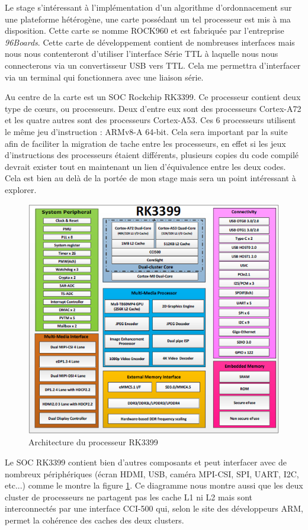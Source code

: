 Le stage s'intéressant à l'implémentation d'un algorithme d'ordonnacement sur une plateforme hétérogène, une carte possédant un tel processeur est mis à ma disposition. Cette carte se nomme ROCK960 et est fabriquée par l'entreprise \textit{96Boards}. Cette carte de développement contient de nombreuses interfaces mais nous nous contenteront d'utiliser l'interface Série TTL à laquelle nous nous connecterons via un convertisseur USB vers TTL. Cela me permettra d'interfacer via un terminal qui fonctionnera avec une liaison série. 

Au centre de la carte est un \gls{SOC} Rockchip RK3399. Ce processeur contient deux type de cœurs, ou processeurs. Deux d'entre eux sont des processeurs Cortex-A72 et les quatre autres sont des processeurs Cortex-A53. Ces 6 processeurs utilisent le même jeu d'instruction : ARMv8-A 64-bit. Cela sera important par la suite afin de faciliter la migration de tache entre les processeurs, en effet si les jeux d'instructions des processeurs étaient différents, plusieurs copies du code compilé devrait exister tout en maintenant un lien d'équivalence entre les deux codes. Cela est bien au delà de la portée de mon stage mais sera un point intéressant à explorer.

\begin{figure}[H]
    \centering
    \includegraphics[width=0.45\paperwidth]{Images/RK3399_Block_Diagram.png}
    \caption{Architecture du processeur RK3399}
    \label{fig:archi_rk3399}
\end{figure}

Le SOC RK3399 contient bien d'autres composants et peut interfacer avec de nombreux périphériques (écran HDMI, USB, caméra MPI-CSI, SPI, UART, I2C, etc...) comme le montre la figure \ref{fig:archi_rk3399}. Ce diagramme nous montre aussi que les deux \gls{cluster} de processeurs ne partagent pas les cache L1 ni L2 mais sont interconnectés par une interface CCI-500 qui, selon le site des développeurs ARM, permet la cohérence des caches des deux clusters.
